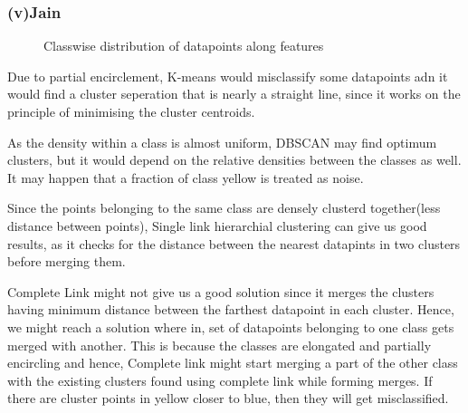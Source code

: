 \documentclass[paper=a4, fontsize=11pt]{scrartcl}
\numberwithin{equation}{section}		%
\numberwithin{figure}{section}			%
\numberwithin{table}{section}				%
\begin{document}
\subsubsection*{(v)Jain}
\begin{figure}[H]
  \centering
  \hfill
  \caption*{Classwise distribution of datapoints along features}
\end{figure}

Due to partial encirclement, K-means would misclassify some datapoints adn it would find a cluster seperation that is nearly a straight line, since it works on the principle of minimising the cluster centroids.

As the density within a class is almost uniform, DBSCAN may find optimum clusters, but it would depend on the relative densities between the classes as well. It may happen that a fraction of class yellow is treated as noise. 

Since the points belonging to the same class are densely clusterd together(less distance between points), Single link hierarchial clustering can give us good results, as it checks for the distance between the nearest datapints in two clusters before merging them. 

Complete Link might not give us a good solution since it merges the clusters having minimum distance between the farthest datapoint in each cluster. Hence, we might reach a solution where in, set of datapoints belonging to one class gets merged with another. This is because the classes are elongated and partially encircling and hence, Complete link might start merging a part of the other class with the existing clusters found using complete link while forming merges. If there are cluster points in yellow closer to blue, then they will get misclassified.
\end{document}
